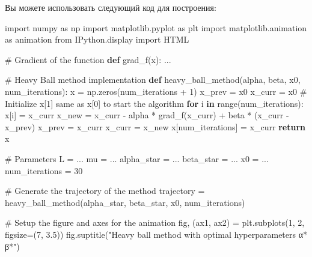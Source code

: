 \documentclass[
  russian,
  letterpaper,
  DIV=11,
  numbers=noendperiod]{scrartcl}
\newenvironment{Shaded}{\begin{snugshade}}{\end{snugshade}}
\newcommand{\BuiltInTok}[1]{\textcolor[rgb]{0.00,0.23,0.31}{#1}}
\newcommand{\CommentTok}[1]{\textcolor[rgb]{0.37,0.37,0.37}{#1}}
\newcommand{\ControlFlowTok}[1]{\textcolor[rgb]{0.00,0.23,0.31}{\textbf{#1}}}
\newcommand{\DecValTok}[1]{\textcolor[rgb]{0.68,0.00,0.00}{#1}}
\newcommand{\FloatTok}[1]{\textcolor[rgb]{0.68,0.00,0.00}{#1}}
\newcommand{\ImportTok}[1]{\textcolor[rgb]{0.00,0.46,0.62}{#1}}
\newcommand{\KeywordTok}[1]{\textcolor[rgb]{0.00,0.23,0.31}{\textbf{#1}}}
\newcommand{\NormalTok}[1]{\textcolor[rgb]{0.00,0.23,0.31}{#1}}
\newcommand{\OperatorTok}[1]{\textcolor[rgb]{0.37,0.37,0.37}{#1}}
\newcommand{\StringTok}[1]{\textcolor[rgb]{0.13,0.47,0.30}{#1}}
\begin{document}
\begin{enumerate}
\begin{enumerate}
    Вы можете использовать следующий код для построения:

\begin{Shaded}
\begin{Highlighting}[]
\ImportTok{import}\NormalTok{ numpy }\ImportTok{as}\NormalTok{ np}
\ImportTok{import}\NormalTok{ matplotlib.pyplot }\ImportTok{as}\NormalTok{ plt}
\ImportTok{import}\NormalTok{ matplotlib.animation }\ImportTok{as}\NormalTok{ animation}
\ImportTok{from}\NormalTok{ IPython.display }\ImportTok{import}\NormalTok{ HTML}

\CommentTok{\# Gradient of the function}
\KeywordTok{def}\NormalTok{ grad\_f(x):}
\NormalTok{    ...}

\CommentTok{\# Heavy Ball method implementation}
\KeywordTok{def}\NormalTok{ heavy\_ball\_method(alpha, beta, x0, num\_iterations):}
\NormalTok{    x }\OperatorTok{=}\NormalTok{ np.zeros(num\_iterations }\OperatorTok{+} \DecValTok{1}\NormalTok{)}
\NormalTok{    x\_prev }\OperatorTok{=}\NormalTok{ x0}
\NormalTok{    x\_curr }\OperatorTok{=}\NormalTok{ x0  }\CommentTok{\# Initialize x[1] same as x[0] to start the algorithm}
    \ControlFlowTok{for}\NormalTok{ i }\KeywordTok{in} \BuiltInTok{range}\NormalTok{(num\_iterations):}
\NormalTok{        x[i] }\OperatorTok{=}\NormalTok{ x\_curr}
\NormalTok{        x\_new }\OperatorTok{=}\NormalTok{ x\_curr }\OperatorTok{{-}}\NormalTok{ alpha }\OperatorTok{*}\NormalTok{ grad\_f(x\_curr) }\OperatorTok{+}\NormalTok{ beta }\OperatorTok{*}\NormalTok{ (x\_curr }\OperatorTok{{-}}\NormalTok{ x\_prev)}
\NormalTok{        x\_prev }\OperatorTok{=}\NormalTok{ x\_curr}
\NormalTok{        x\_curr }\OperatorTok{=}\NormalTok{ x\_new}
\NormalTok{    x[num\_iterations] }\OperatorTok{=}\NormalTok{ x\_curr}
    \ControlFlowTok{return}\NormalTok{ x}

\CommentTok{\# Parameters}
\NormalTok{L }\OperatorTok{=}\NormalTok{ ...}
\NormalTok{mu }\OperatorTok{=}\NormalTok{ ...}
\NormalTok{alpha\_star }\OperatorTok{=}\NormalTok{ ...}
\NormalTok{beta\_star }\OperatorTok{=}\NormalTok{ ...}
\NormalTok{x0 }\OperatorTok{=}\NormalTok{ ...}
\NormalTok{num\_iterations }\OperatorTok{=} \DecValTok{30}

\CommentTok{\# Generate the trajectory of the method}
\NormalTok{trajectory }\OperatorTok{=}\NormalTok{ heavy\_ball\_method(alpha\_star, beta\_star, x0, num\_iterations)}

\CommentTok{\# Setup the figure and axes for the animation}
\NormalTok{fig, (ax1, ax2) }\OperatorTok{=}\NormalTok{ plt.subplots(}\DecValTok{1}\NormalTok{, }\DecValTok{2}\NormalTok{, figsize}\OperatorTok{=}\NormalTok{(}\DecValTok{7}\NormalTok{, }\FloatTok{3.5}\NormalTok{))}
\NormalTok{fig.suptitle(}\StringTok{"Heavy ball method with optimal hyperparameters α* β*"}\NormalTok{)}


\end{Highlighting}
\end{Shaded}
\end{enumerate}
\end{enumerate}
\end{document}
